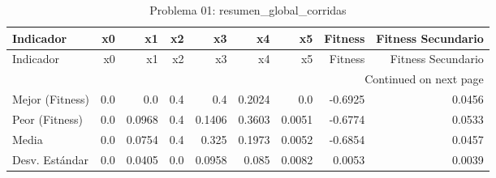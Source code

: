 \begin{longtable}{lrrrrrrrr}
\caption{Problema 01: resumen\_global\_corridas}\label{tab:resumen_global_corridas} \\
\toprule
Indicador & x0 & x1 & x2 & x3 & x4 & x5 & Fitness & Fitness Secundario \\
\midrule
\endfirsthead
\toprule
Indicador & x0 & x1 & x2 & x3 & x4 & x5 & Fitness & Fitness Secundario \\
\midrule
\endhead
\midrule
\multicolumn{9}{r}{Continued on next page} \\
\midrule
\endfoot
\bottomrule
\endlastfoot
Mejor (Fitness) & 0.0 & 0.0 & 0.4 & 0.4 & 0.2024 & 0.0 & -0.6925 & 0.0456 \\
Peor (Fitness) & 0.0 & 0.0968 & 0.4 & 0.1406 & 0.3603 & 0.0051 & -0.6774 & 0.0533 \\
Media & 0.0 & 0.0754 & 0.4 & 0.325 & 0.1973 & 0.0052 & -0.6854 & 0.0457 \\
Desv. Estándar & 0.0 & 0.0405 & 0.0 & 0.0958 & 0.085 & 0.0082 & 0.0053 & 0.0039 \\
\end{longtable}